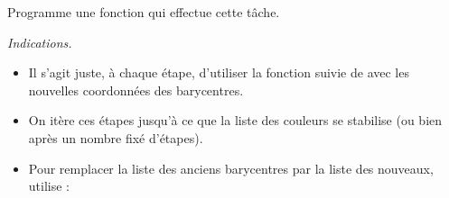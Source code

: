 \documentclass[11pt,class=report,crop=false]{standalone}
\begin{document}
\begin{activite}[Barycentres]
\begin{enumerate}
	Programme une fonction  qui effectue cette tâche.
	
	\smallskip
	
	\emph{Indications.}
	\begin{itemize}	
		\item Il s'agit juste, à chaque étape, d'utiliser la fonction 
		suivie de  avec les nouvelles coordonnées des barycentres.
		
		\item On itère ces étapes jusqu'à ce que la liste des couleurs se stabilise (ou bien après un nombre fixé d'étapes).
		
		\item Pour remplacer la liste des anciens barycentres par la liste des nouveaux, utilise :		
	\end{itemize}
\end{enumerate}

\medskip


\end{activite}
\end{document}
